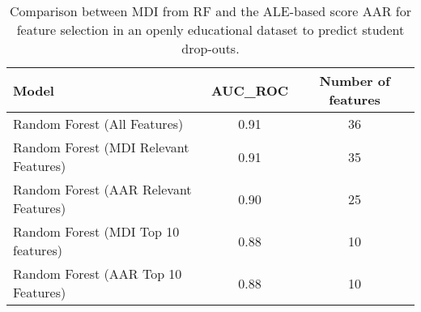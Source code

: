 \begin{table}[ht]
\caption{Comparison between MDI from RF and the ALE-based score AAR for feature selection in an openly educational dataset to predict student drop-outs.}
\label{tbl:feature_selection_edu}
\centering
{}
\begin{tabular}{l|c|c}
\toprule
Model & AUC\_ROC & Number of features \\
\midrule
Random Forest (All Features) & 0.91 & 36 \\
Random Forest (MDI Relevant Features) & 0.91 & 35 \\
Random Forest (AAR Relevant Features) & 0.90 & 25 \\
Random Forest (MDI Top 10 features) & 0.88 & 10 \\
Random Forest (AAR Top 10 Features) & 0.88 & 10 \\
\bottomrule
\end{tabular}
\end{table}

